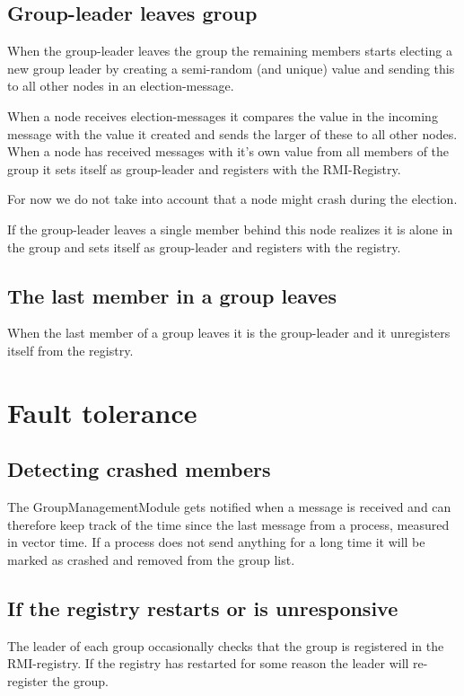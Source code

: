 \documentclass[english]{article}
\begin{document}
\subsection{Group-leader leaves group}
When the group-leader leaves the group the remaining members starts electing a new group leader by creating a semi-random (and unique) value and sending this to all other nodes in an election-message.

When a node receives election-messages it compares the value in the incoming message with the value it created and sends the larger of these to all other nodes. When a node has received messages with it's own value from all members of the group it sets itself as group-leader and registers with the RMI-Registry.

For now we do not take into account that a node might crash during the election.

If the group-leader leaves a single member behind this node realizes it is alone in the group and sets itself as group-leader and registers with the registry.

\subsection{The last member in a group leaves}
When the last member of a group leaves it is the group-leader and it unregisters itself from the registry.

\section{Fault tolerance}

\subsection{Detecting crashed members}
The GroupManagementModule gets notified when a message is received and can therefore keep track of the time since the last message from a process, measured in vector time. If a process does not send anything for a long time it will be marked as crashed and removed from the group list.

\subsection{If the registry restarts or is unresponsive}
The leader of each group occasionally checks that the group is registered in the RMI-registry. If the registry has restarted for some reason the leader will re-register the group.
\end{document}
